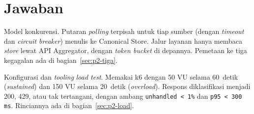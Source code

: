 \section{Jawaban}

\begin{jawaban}
Model konkurensi. Putaran \emph{polling} terpisah untuk tiap sumber (dengan \emph{timeout} dan \emph{circuit breaker}) menulis ke
Canonical Store. Jalur layanan hanya membaca \emph{store} lewat API Aggregator, dengan \emph{token bucket} di depannya. Pemetaan ke
tiga kegagalan ada di bagian~\ref{sec:p2-tiga}.

Konfigurasi dan \emph{tooling} \emph{load test}. Memakai k6 dengan 50 VU selama 60~detik (\emph{sustained}) dan 150 VU selama
20~detik (\emph{overload}). Respons diklasifikasi menjadi 200, 429, atau tak tertangani, dengan ambang
\texttt{unhandled < 1\%} dan \texttt{p95 < 300 ms}. Rinciannya ada di bagian~\ref{sec:p2-load}.
\end{jawaban}
